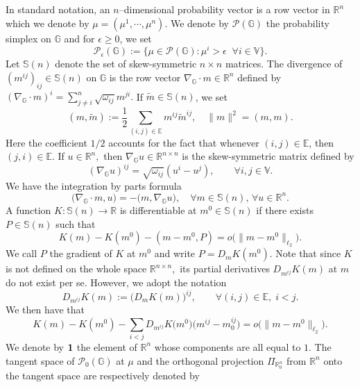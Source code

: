 \documentclass[10pt]{article}
\numberwithin{equation}{section}
\newcommand{\cP}{ \mathcal{P}}
\newcommand{\bE}{\mathbb E}
\newcommand{\bG}{\mathbb G}
\newcommand{\bR}{\mathbb R}
\newcommand{\bS}{\mathbb S}
\newcommand{\bV}{\mathbb V}
\def\G{\mathbb{G}}
\begin{document}
In standard notation, an $n$--dimensional probability vector is a row vector in $\bR^n$ which we denote by $\mu=(\mu^1, \cdots, \mu^n).$ We denote by $\cP(\bG)$ the probability simplex on $\bG$ and for $\epsilon\geq 0$, we set
\[
\cP_\epsilon(\bG):=\big\{\mu \in \cP(\bG): \mu^i > \epsilon \;\; \forall i \in \bV\big\}.
\]
Let $\bS(n)$ denote the set of skew-symmetric $n\times n$ matrices. The divergence of $(m^{ij})_{ij} \in \bS(n)$ on $\bG$ is the row vector $\nabla_\bG \cdot m \in \bR^n$ defined by $(\nabla_\bG \cdot m)^i=\sum_{j \not= i}^n \sqrt{\omega_{ij}} m^{ji}.$ If $\tilde m \in \bS(n)$, we set
\[
(m,\tilde m ):=\frac{1}{2}\sum_{(i,j)\in \bE} m^{ij} \tilde m^{ij}, \quad \|m\|^2=(m,m ).  
\] 
Here the coefficient $1/2$ accounts for the fact that whenever $(i,j) \in \bE$, then $(j,i) \in \bE$. If $u \in \bR^n,$ then $\nabla_\bG u \in \bR^{n \times n}$ is the skew-symmetric matrix defined by 
\[
(\nabla_\bG u)^{ij}=\sqrt{\omega_{ij}} (u^i-u^j), \qquad \forall i, j \in \bV.
\]
We have the integration by parts formula %
\begin{equation}\label{eq:integration by parts formula} \big(\nabla_\bG \cdot m, u\big)=-\big(m, \nabla_\bG u\big),\quad \forall m \in \mathbb{S}(n),\,\forall u \in \mathbb{R}^n.\end{equation} 
A function $K: \bS(n) \to \bR$ is differentiable at $m^0\in \bS(n)$ if there exists $P \in \bS(n)$ such that 
\[
K(m)-K(m^0)-(m-m^0, P)=o\big(\|m-m^0\|_{\ell_2}\big).
\]
We call $P$ the gradient of $K$ at $m^0$ and write $P=D_m K(m^0).$ Note that since $K$ is not defined on the whole space $\bR^{n \times n},$ its partial derivatives $D_{m^{ij}} K(m)$ at $m$ do not exist per se. However, we adopt the notation
\[
D_{m^{ij}} K(m):=\big(D_mK(m)\big)^{ij}, \qquad \forall (i, j) \in \bE, \; i<j.
\]
We then have that 
\[
K(m)-K(m^0)-\sum_{i<j} D_{m^{ij}} K\big(m^0\big) \big(m^{ij}-m_0^{ij}\big)=o\big(\|m-m^0\|_{\ell_2}\big).
\]
We denote by ${\bf 1} $ the element of $\bR^n$ whose components are all equal to $1$. The tangent space of $\cP_0(\bG)$ at $\mu$ and the orthogonal projection $\Pi_{\bR^n_0}$ from $\bR^n$ onto the tangent space are respectively denoted by 
\end{document}
